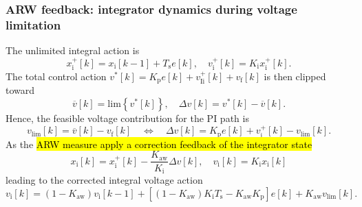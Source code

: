 \begin{frame}
    \frametitle{ARW feedback: integrator dynamics during voltage limitation}
    The unlimited integral action is
    \begin{equation}
        x^+_{\mathrm{i}}[k]
        =
        x_{\mathrm{i}}[k-1]
        +
        T_{\mathrm{s}}e[k], \quad v^+_{\mathrm{i}}[k] = K_{\mathrm{i}}x^+_{\mathrm{i}}[k].
    \end{equation}\pause%
    The total control action $v^*[k]
        =
        K_{\mathrm{p}} e[k]
        +
        v^+_{\mathrm{Ii}}[k] + v_\mathrm{f}[k]$ is then clipped toward
    \begin{equation}
        \overline{v}[k] = \mathrm{lim}\left\{v^*[k]\right\}, \quad \Delta v[k] = v^*[k] - \overline{v}[k].
    \end{equation}\pause%
    Hence, the feasible voltage contribution for the PI path is
    \begin{equation}
        v_{\mathrm{lim}}[k] = \overline{v}[k] - v_\mathrm{f}[k] \quad \Leftrightarrow \quad \Delta v[k] = K_{\mathrm{p}} e[k] + v^+_{\mathrm{i}}[k] - v_{\mathrm{lim}}[k].
    \end{equation}\pause%
    As the \hl{ARW measure apply a correction feedback of the integrator state}
    \begin{equation}
        x_{\mathrm{i}}[k] = x^+_{\mathrm{i}}[k] - \frac{K_{\mathrm{aw}}}{K_{\mathrm{i}}}\Delta v[k], \quad v_{\mathrm{i}}[k] = K_{\mathrm{i}}x_{\mathrm{i}}[k]
    \end{equation}\pause%
    leading to the corrected integral voltage action
    \begin{equation}
        v_{\mathrm{i}}[k]
        =
        (1-K_{\mathrm{aw}})v_{\mathrm{i}}[k-1]
        +
        \left[\left(1-K_{\mathrm{aw}}\right)K_{\mathrm{i}}T_{\mathrm{s}}-K_{\mathrm{aw}}K_{\mathrm{p}}\right]e[k]
        +
        K_{\mathrm{aw}}v_{\mathrm{lim}}[k].
    \end{equation}
\end{frame}

